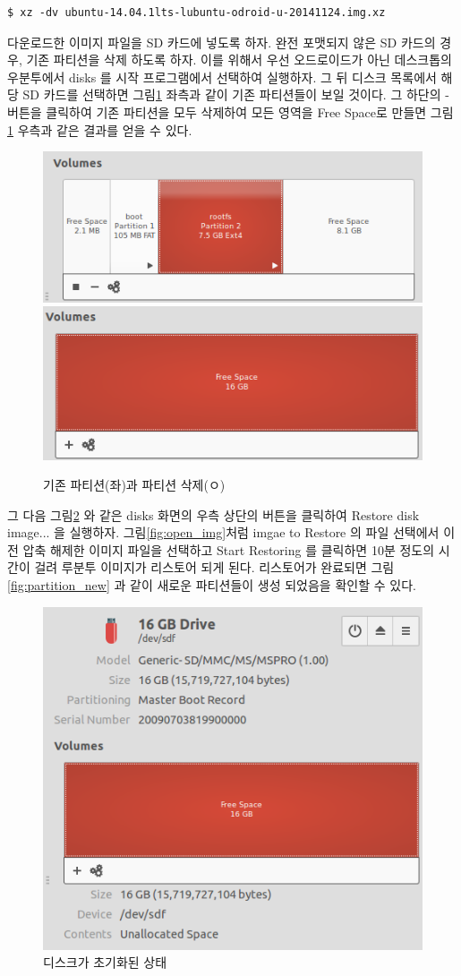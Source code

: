 \begin{lstlisting}[language=ROS]
$ xz -dv ubuntu-14.04.1lts-lubuntu-odroid-u-20141124.img.xz
\end{lstlisting}

다운로드한 이미지 파일을 SD 카드에 넣도록 하자. 완전 포맷되지 않은 SD 카드의 경우, 기존 파티션을 삭제 하도록 하자. 이를 위해서 우선 오드로이드가 아닌 데스크톱의 우분투에서 disks 를 시작 프로그램에서 선택하여 실행하자. 그 뒤 디스크 목록에서 해당 SD 카드를 선택하면 그림\ref{fig:partition_old} 좌측과 같이 기존 파티션들이 보일 것이다. 그 하단의 - 버튼을 클릭하여 기존 파티션을 모두 삭제하여 모든 영역을 Free Space로 만들면 그림\ref{fig:partition_old} 우측과 같은 결과를 얻을 수 있다.

\begin{figure}[h]
\centering
\includegraphics[width=0.45\columnwidth]{pictures/chapter3/odroid_partition1.png}
\includegraphics[width=0.44\columnwidth]{pictures/chapter3/odroid_partition2.png}
\caption{기존 파티션(좌)과 파티션 삭제(ㅇ)}
\label{fig:partition_old}
\end{figure}

그 다음 그림\ref{fig:partition_cleaned} 와 같은 disks 화면의 우측 상단의 버튼을 클릭하여 Restore disk image... 을 실행하자. 그림\ref{fig:open_img}처럼 imgae to Restore 의 파일 선택에서 이전 압축 해제한 이미지 파일을 선택하고 Start Restoring 를 클릭하면 10분 정도의 시간이 걸려 루분투 이미지가 리스토어 되게 된다. 리스토어가 완료되면 그림\ref{fig:partition_new} 과 같이 새로운 파티션들이 생성 되었음을 확인할 수 있다.

\begin{figure}[h]
\centering\includegraphics[width=0.5\columnwidth]{pictures/chapter3/odroid_sd.png}
\caption{디스크가 초기화된 상태}
\label{fig:partition_cleaned}
\end{figure}

